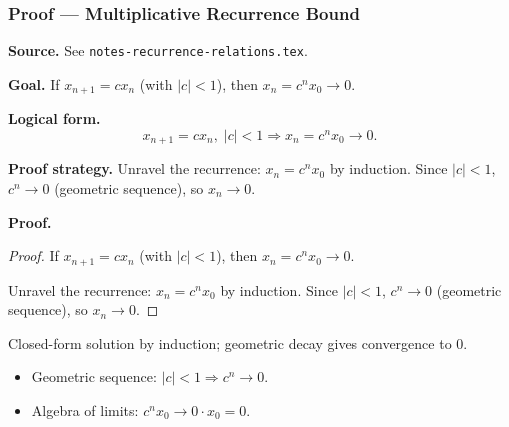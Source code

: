 
\clearpage
{}
\hypertarget{proof-RA-ABB-P-multiplicative-recurrence}{}

\subsubsection[Multiplicative Recurrence Bound]{Proof --- Multiplicative Recurrence Bound}

\bigskip

\noindent
\textbf{Source.} See \texttt{notes-recurrence-relations.tex}.

\vspace{0.75em}

\noindent
\textbf{Goal.} If $x_{n+1} = c x_n$ (with $|c| < 1$), then $x_n = c^n x_0 \to 0$.

\vspace{0.75em}

\noindent
\textbf{Logical form.}
\[
  x_{n+1} = c x_n,\; |c| < 1 \Rightarrow x_n = c^n x_0 \to 0.
\]

\vspace{0.75em}

\noindent
\textbf{Proof strategy.} Unravel the recurrence: $x_n = c^n x_0$ by induction. Since $|c| < 1$, $c^n \to 0$ (geometric sequence), so $x_n \to 0$.

\vspace{0.75em}

\noindent
\textbf{Proof.}
\begin{proof}
\Claim If $x_{n+1} = c x_n$ (with $|c| < 1$), then $x_n = c^n x_0 \to 0$.

\Given 

\Goal 

\Strategy Unravel the recurrence: $x_n = c^n x_0$ by induction. Since $|c| < 1$, $c^n \to 0$ (geometric sequence), so $x_n \to 0$.

\medskip


\end{proof}

\begin{remark*}
Closed-form solution by induction; geometric decay gives convergence to 0.
\end{remark*}

\begin{remark*}[Dependencies]
\begin{itemize}
  \item Geometric sequence: $|c| < 1 \Rightarrow c^n \to 0$.
  \item Algebra of limits: $c^n x_0 \to 0 \cdot x_0 = 0$.
\end{itemize}
\end{remark*}
